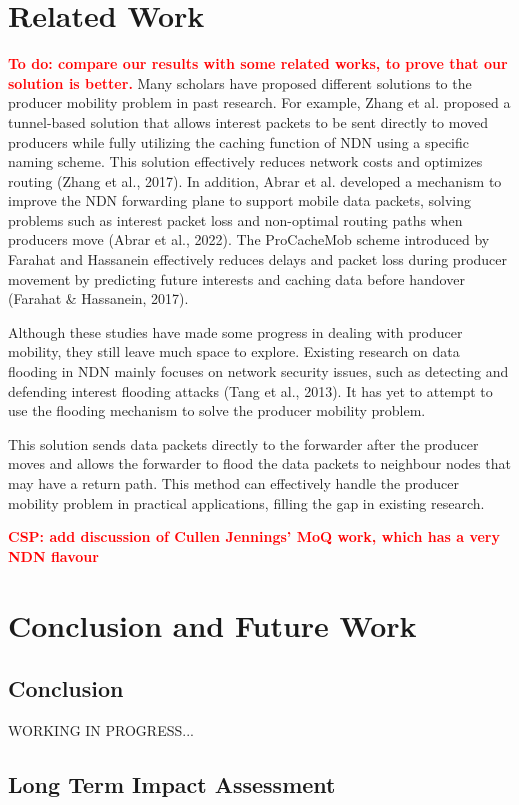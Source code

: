 \documentclass[conference]{IEEEtran}
\newcommand{\todo}[1]{\textbf{\textcolor{red}{To do: #1}}}
\newcommand{\csp}[1]{\textbf{\textcolor{red}{CSP: #1}}}
\begin{document}
\section{Related Work}
\todo{compare our results with some related works, to prove that our solution is better.}
Many scholars have proposed different solutions to the producer mobility problem in past research. For example, Zhang et al. proposed a tunnel-based solution that allows interest packets to be sent directly to moved producers while fully utilizing the caching function of NDN using a specific naming scheme. This solution effectively reduces network costs and optimizes routing (Zhang et al., 2017). In addition, Abrar et al. developed a mechanism to improve the NDN forwarding plane to support mobile data packets, solving problems such as interest packet loss and non-optimal routing paths when producers move (Abrar et al., 2022). The ProCacheMob scheme introduced by Farahat and Hassanein effectively reduces delays and packet loss during producer movement by predicting future interests and caching data before handover (Farahat \& Hassanein, 2017).

Although these studies have made some progress in dealing with producer mobility, they still leave much space to explore. Existing research on data flooding in NDN mainly focuses on network security issues, such as detecting and defending interest flooding attacks (Tang et al., 2013). It has yet to attempt to use the flooding mechanism to solve the producer mobility problem.

This solution sends data packets directly to the forwarder after the producer moves and allows the forwarder to flood the data packets to neighbour nodes that may have a return path. This method can effectively handle the producer mobility problem in practical applications, filling the gap in existing research.

\csp{add discussion of Cullen Jennings' MoQ work, which has a very NDN flavour}

\section{Conclusion and Future Work}
\subsection{Conclusion}
WORKING IN PROGRESS...
\subsection{Long Term Impact Assessment}
\end{document}
